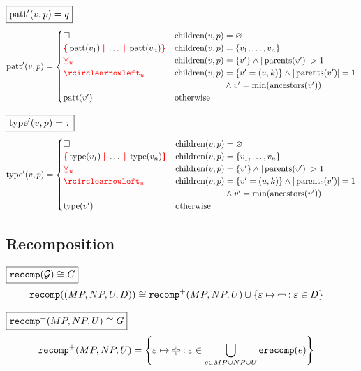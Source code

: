 \noindent $\boxed{\operatorname{\text{patt}}'(v, p) = q}$
%
\begin{align*}
  \patt'(v,p) = \begin{cases}
    \hole & \children(v,p) = \varnothing \\
    \conflictHole{\patt(v_1),\ldots,\patt(v_n)} & \children(v,p) = \SetOf{v_1, \ldots, v_n} \\
    \multiVertex{u} & \children(v,p) = \SetOf{v'} \land |\parents(v')| > 1 \\
    \cycleVertex{u} & \children(v,p) = \SetOf{v'=(u,k)} \land |\parents(v')| = 1 \\
        & \phantom{\children(v,p)} \land v' = \min(\ancestors(v')) \\
    \patt(v') & \text{otherwise} \\
  \end{cases}
\end{align*}

\noindent $\boxed{\operatorname{\text{type}}'(v, p) = \tau}$
%
\begin{align*}
  \type'(v,p) = \begin{cases}
    \hole & \children(v,p) = \varnothing \\
    \conflictHole{\type(v_1),\ldots,\type(v_n)} & \children(v,p) = \SetOf{v_1, \ldots, v_n} \\
    \multiVertex{u} & \children(v,p) = \SetOf{v'} \land |\parents(v')| > 1 \\
    \cycleVertex{u} & \children(v,p) = \SetOf{v' = (u,k)} \land |\parents(v')| = 1 \\
        & \phantom{\children(v,p)} \land v' = \min(\ancestors(v')) \\
    \type(v') & \text{otherwise} \\
  \end{cases}
\end{align*}


\subsection{Recomposition}

\noindent $\boxed{\operatorname{\texttt{recomp}}\mathopen{}\left(\mathcal{G}\right)\mathclose{} \cong G}$
%
\begin{align*}
  \recomp{(MP, NP, U, D)} &\cong \recompPlus{MP, NP, U} \cup \SetOf{\e \mapsto \Minus \SuchThat{\e \in D}}
\end{align*}

\noindent $\boxed{\operatorname{\texttt{recomp}^{+}}\mathopen{}\left(MP, NP, U\right)\mathclose{} \cong G}$
%
\begin{align*}
  \recompPlus{MP, NP, U} &= \SetOf{\e \mapsto \Plus \SuchThat{\e \in \bigcup_{e \in MP \cup NP \cup U} \erecomp{e}}}
\end{align*}

